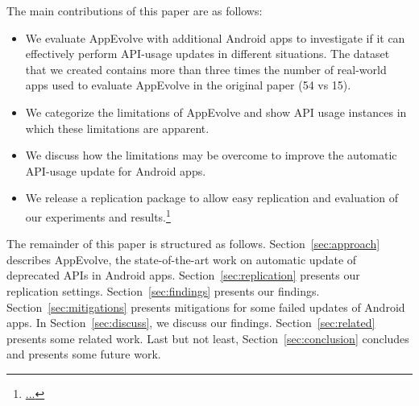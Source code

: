 The main contributions of this paper are as follows:
\begin{itemize}
	\item We  evaluate AppEvolve with additional Android apps to investigate if it can effectively perform API-usage updates in different situations. The dataset that we created contains more than three times the number of real-world apps used to evaluate AppEvolve in the original paper (54 vs 15).
	\item We categorize the limitations of AppEvolve and show API usage instances in which these limitations are apparent.
	\item We discuss how the limitations may be overcome to improve the automatic API-usage update for Android apps.
	\item We release a replication package to allow easy replication and evaluation of our experiments and results.\footnote{\url{...}}
\end{itemize}

The remainder of this paper is structured as follows. Section~\ref{sec:approach} describes AppEvolve, the state-of-the-art work on automatic update of deprecated APIs in Android apps. Section~\ref{sec:replication} presents our replication settings. Section~\ref{sec:findings} presents our findings. Section~\ref{sec:mitigations} presents mitigations for some failed updates of Android apps. In Section~\ref{sec:discuss}, we discuss our findings. Section~\ref{sec:related} presents some related work. Last but not least, Section~\ref{sec:conclusion} concludes and presents some future work.
